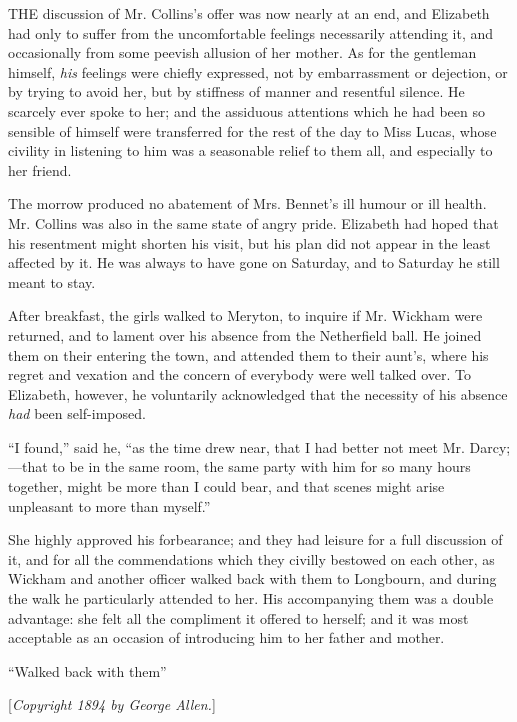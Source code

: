 \documentclass[12pt,openright]{book}
\begin{document}
\noindent  THE discussion of Mr. Collins’s offer was now nearly at an end, and Elizabeth had only to suffer from the uncomfortable feelings necessarily attending it, and occasionally from some peevish allusion of her mother. As for the gentleman himself, \textit{his} feelings were chiefly expressed, not by embarrassment or dejection, or by trying to avoid her, but by stiffness of manner and resentful silence. He scarcely ever spoke to her; and the assiduous attentions which he had been so sensible of himself were transferred for the rest of the day to Miss Lucas, whose civility in listening to him was a seasonable relief to them all, and especially to her friend.

The morrow produced no abatement of Mrs. Bennet’s ill humour or ill health. Mr. Collins was also in the same state of angry pride. Elizabeth had hoped that his resentment might shorten his visit, but his plan did not appear in the least affected by it. He was always to have gone on Saturday, and to Saturday he still meant to stay.

After breakfast, the girls walked to Meryton, to inquire if Mr. Wickham were returned, and to lament over his absence from the Netherfield ball. He joined them on their entering the town, and attended them to their aunt’s, where his regret and vexation and the concern of everybody were well talked over. To Elizabeth, however, he voluntarily acknowledged that the necessity of his absence \textit{had} been self-imposed.

“I found,” said he, “as the time drew near, that I had better not meet Mr. Darcy;—that to be in the same room, the same party with him for so many hours together, might be more than I could bear, and that scenes might arise unpleasant to more than myself.”

She highly approved his forbearance; and they had leisure for a full discussion of it, and for all the commendations which they civilly bestowed on each other, as Wickham and another officer walked back with them to Longbourn, and during the walk he particularly attended to her. His accompanying them was a double advantage: she felt all the compliment it offered to herself; and it was most acceptable as an occasion of introducing him to her father and mother.

“Walked back with them”

[\textit{Copyright 1894 by George Allen.}]
\end{document}
